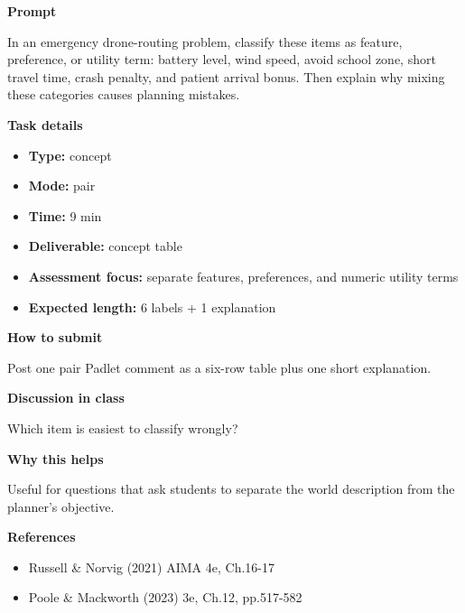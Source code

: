 \documentclass[11pt]{article}
\begin{document}
\begin{tcolorbox}[colback=white,colframe=MidnightBlue,title={Q1 Starter Classification},fonttitle=\bfseries,breakable]
\begin{center}
\end{center}

{\large\bfseries\color{MidnightBlue} Prompt}\par\medskip
In an emergency drone-routing problem, classify these items as feature, preference, or utility term: battery level, wind speed, avoid school zone, short travel time, crash penalty, and patient arrival bonus. Then explain why mixing these categories causes planning mistakes.

{\large\bfseries\color{MidnightBlue} Task details}\par\medskip
\begin{itemize}\item \textbf{Type:} concept
\item \textbf{Mode:} pair
\item \textbf{Time:} 9 min
\item \textbf{Deliverable:} concept table
\item \textbf{Assessment focus:} separate features, preferences, and numeric utility terms
\item \textbf{Expected length:} 6 labels + 1 explanation\end{itemize}

{\large\bfseries\color{MidnightBlue} How to submit}\par\medskip
Post one pair Padlet comment as a six-row table plus one short explanation.

{\large\bfseries\color{MidnightBlue} Discussion in class}\par\medskip
Which item is easiest to classify wrongly?

{\large\bfseries\color{MidnightBlue} Why this helps}\par\medskip
Useful for questions that ask students to separate the world description from the planner's objective.

{\large\bfseries\color{MidnightBlue} References}\par\medskip
\begin{itemize}\item Russell \& Norvig (2021) AIMA 4e, Ch.16-17
\item Poole \& Mackworth (2023) 3e, Ch.12, pp.517-582\end{itemize}
\end{tcolorbox}
\end{document}
